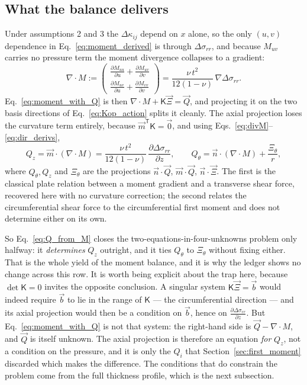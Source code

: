 \documentclass[11pt]{article}
\begin{document}
\subsection{What the balance delivers}\label{sec:Q_deliver}
Under assumptions 2 and 3 the
$\Delta\kappa_{ij}$ depend on $x$ alone, so the only $\left(u,v\right)$
dependence in Eq.~\eqref{eq:moment_derived} is through $\Delta\sigma_{rr}$, and
because $M_{uv}$ carries no pressure term the moment divergence collapses to a
gradient:
\begin{equation}\label{eq:divM}
    \nabla\cdot M
    := \begin{pmatrix}
      \frac{\partial M_{uu}}{\partial u} + \frac{\partial M_{uv}}{\partial v}\\[4pt]
      \frac{\partial M_{uv}}{\partial u} + \frac{\partial M_{vv}}{\partial v}
    \end{pmatrix}
    = \frac{\nu\,t^{2}}{12\left(1-\nu\right)}\,\nabla\Delta\sigma_{rr}.
\end{equation}
Eq.~\eqref{eq:moment_with_Q} is then $\nabla\cdot M + \mathsf K\vec\Xi = \vec Q$,
and projecting it on the two basis directions of Eq.~\eqref{eq:Kop_action} splits
it cleanly. The axial projection loses the curvature term entirely, because
$\vec m^{\mathsf T}\mathsf K = \vec 0$, and using
Eqs.~\eqref{eq:divM}--\eqref{eq:dir_derivs},
\begin{equation}\label{eq:Q_from_M}
    \boxed{\;Q_{z} = \vec m\cdot\left(\nabla\cdot M\right)
      = \frac{\nu\,t^{2}}{12\left(1-\nu\right)}\,
        \frac{\partial \Delta\sigma_{rr}}{\partial z},
    \qquad
    Q_{\theta} = \vec n\cdot\left(\nabla\cdot M\right) + \frac{\Xi_{\theta}}{r},\;}
\end{equation}
where $Q_\theta,Q_z$ and $\Xi_\theta$ are the projections
$\vec n\cdot\vec Q$, $\vec m\cdot\vec Q$, $\vec n\cdot\vec\Xi$. The first is the
classical plate relation between a moment gradient and a transverse shear force,
recovered here with no curvature correction; the second relates the
circumferential shear force to the circumferential first moment and does not
determine either on its own.

So Eq.~\eqref{eq:Q_from_M} closes the two-equations-in-four-unknowns problem
only halfway: it \emph{determines} $Q_z$ outright, and it ties $Q_\theta$ to
$\Xi_\theta$ without fixing either. That is the whole yield of the moment
balance, and it is why the ledger shows no change across this row. It is worth being explicit about the trap here, because
$\det\mathsf K = 0$ invites the opposite conclusion. A singular system
$\mathsf K\vec\Xi = \vec b$ would indeed require $\vec b$ to lie in the range of
$\mathsf K$ --- the circumferential direction --- and its axial projection would
then be a condition on $\vec b$, hence on
$\frac{\partial \Delta\sigma_{rr}}{\partial z}$. But
Eq.~\eqref{eq:moment_with_Q} is not that system: the right-hand side is
$\vec Q - \nabla\cdot M$, and $\vec Q$ is itself unknown. The axial projection is
therefore an equation \emph{for} $Q_z$, not a condition on the pressure, and it
is only the $Q_i$ that Section~\ref{sec:first_moment} discarded which makes the
difference. The conditions that do constrain the problem come from the full
thickness profile, which is the next subsection.
\end{document}
